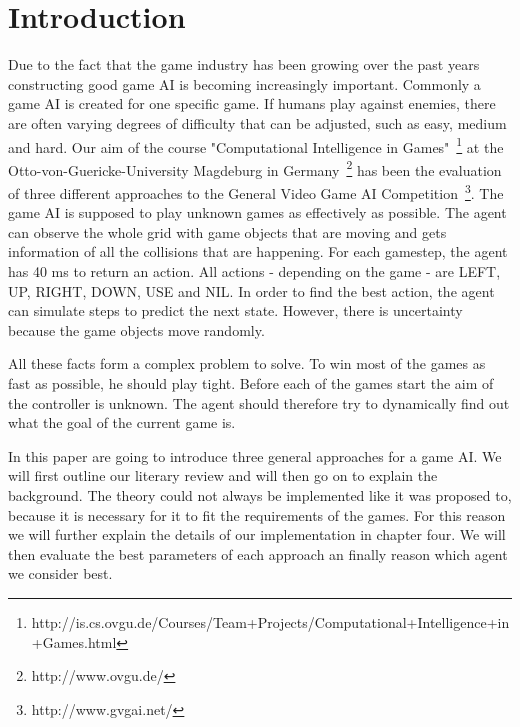 \section{Introduction} 
\label{sec:intro}


Due to the fact that the game industry has been growing over the past years~\cite{gartner}
constructing good game \ac{AI} is becoming increasingly important.
Commonly a game \ac{AI} is created for one specific game. If humans play against
enemies, there are often varying degrees of difficulty that can be adjusted, such as easy, medium and hard.
Our aim of the course "Computational Intelligence in Games"~\footnote{http://is.cs.ovgu.de/Courses/Team+Projects/Computational+Intelligence+in+Games.html} at the Otto-von-Guericke-University Magdeburg in Germany~\footnote{http://www.ovgu.de/} has 
been the evaluation of three different approaches to the General Video Game AI Competition~\footnote{http://www.gvgai.net/}.
The game AI is supposed to play unknown games as effectively as possible. The agent can observe the
whole grid with game objects that are moving and gets information of all the collisions that are happening.
For each gamestep, the agent has 40 ms to return an action. All actions - depending on the game - are  LEFT, UP, RIGHT, DOWN, USE and NIL.
In order to find the best action, the agent can simulate steps to predict the next state. However, there is uncertainty because the game objects move randomly.

All these facts form a complex problem to solve. To win most of the games as fast as possible, he should play tight. 
Before each of the games start the aim of the controller is unknown. The agent should therefore try to dynamically find out what the goal of the current game is.

In this paper are going to introduce three general approaches for a game \ac{AI}. We will first outline our literary review and will then go on to explain the background. The theory could not always be implemented like it was proposed to, because it is necessary for it to fit the requirements of the games. For this reason we will further explain the details of our implementation in chapter four.
We will then evaluate the best parameters of each approach an finally reason which agent we consider best.








